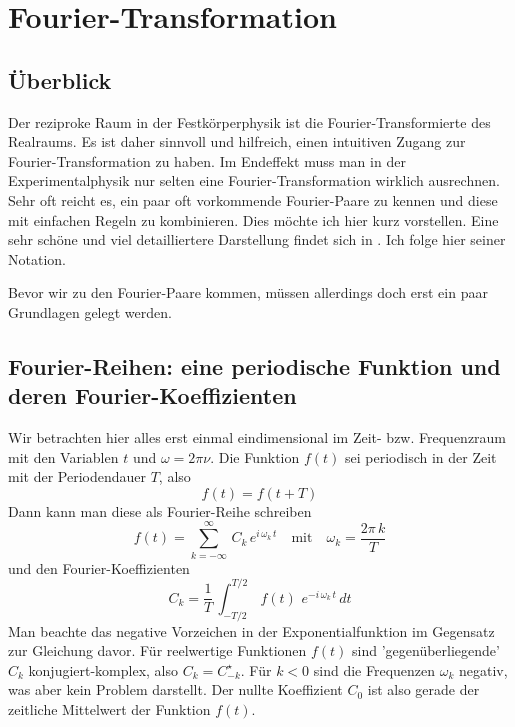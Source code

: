 
\chapter{Fourier-Transformation}



\section{Überblick}

Der reziproke Raum in der Festkörperphysik ist die Fourier-Transformierte des Realraums. Es ist daher sinnvoll und hilfreich, einen intuitiven Zugang zur Fourier-Transformation zu haben. Im Endeffekt muss man in der Experimentalphysik nur selten eine Fourier-Transformation wirklich ausrechnen. Sehr oft reicht es, ein paar oft vorkommende Fourier-Paare zu kennen und diese mit einfachen Regeln zu kombinieren. Dies möchte ich hier kurz vorstellen. Eine sehr schöne und viel detailliertere Darstellung findet sich in \cite{Butz2011}. Ich folge hier seiner Notation.

Bevor wir zu den Fourier-Paare kommen, müssen allerdings doch erst ein paar Grundlagen gelegt werden.

\section{Fourier-Reihen: eine periodische Funktion und deren Fourier-Koeffizienten}

Wir betrachten hier alles erst einmal eindimensional im Zeit- bzw. Frequenzraum mit den Variablen $t$ und $\omega = 2 \pi \nu$. Die Funktion $f(t)$ sei periodisch in der Zeit mit der Periodendauer $T$, also 
\begin{equation}
 f(t) = f (t + T)
\end{equation}
Dann kann man diese als Fourier-Reihe schreiben
\begin{equation}
 f(t) = \sum_{k=-\infty}^{\infty} \, C_k \, e^{i \, \omega_k \, t}
 \quad \text{mit} \quad \omega_k = \frac{2 \pi \, k}{T}
\end{equation}
und den Fourier-Koeffizienten
\begin{equation}
 C_k = \frac{1}{T} \, \int_{-T/2}^{T/2} \, f(t) \, \, e^{-i \, \omega_k \, t} \, dt
\end{equation}
Man beachte das negative Vorzeichen in der Exponentialfunktion im Gegensatz zur Gleichung davor. Für reelwertige Funktionen $f(t)$ sind 'gegenüberliegende' $C_k$ konjugiert-komplex, also  $C_k = C_{-k}^\star$. Für $k<0$ sind die Frequenzen $\omega_k$ negativ, was aber kein Problem darstellt. Der nullte Koeffizient $C_0$ ist also gerade der zeitliche Mittelwert der Funktion $f(t)$.



